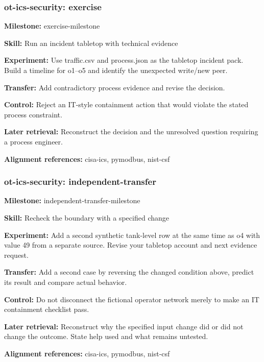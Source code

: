 \subsubsection{ot-ics-security: exercise}
\noindent\textbf{Milestone:} exercise-milestone\par
\noindent\textbf{Skill:} Run an incident tabletop with technical evidence\par
\noindent\textbf{Experiment:} Use traffic.csv and process.json as the tabletop incident pack. Build a timeline for o1–o5 and identify the unexpected write/new peer.\par
\noindent\textbf{Transfer:} Add contradictory process evidence and revise the decision.\par
\noindent\textbf{Control:} Reject an IT-style containment action that would violate the stated process constraint.\par
\noindent\textbf{Later retrieval:} Reconstruct the decision and the unresolved question requiring a process engineer.\par
\noindent\textbf{Alignment references:} cisa-ics, pymodbus, nist-csf\par
\subsubsection{ot-ics-security: independent-transfer}
\noindent\textbf{Milestone:} independent-transfer-milestone\par
\noindent\textbf{Skill:} Recheck the boundary with a specified change\par
\noindent\textbf{Experiment:} Add a second synthetic tank-level row at the same time as o4 with value 49 from a separate source. Revise your tabletop account and next evidence request.\par
\noindent\textbf{Transfer:} Add a second case by reversing the changed condition above, predict its result and compare actual behavior.\par
\noindent\textbf{Control:} Do not disconnect the fictional operator network merely to make an IT containment checklist pass.\par
\noindent\textbf{Later retrieval:} Reconstruct why the specified input change did or did not change the outcome. State help used and what remains untested.\par
\noindent\textbf{Alignment references:} cisa-ics, pymodbus, nist-csf\par

